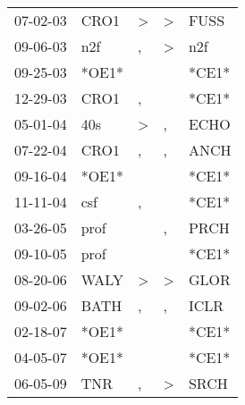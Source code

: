 \begin{supertabular}{p{0.07\textwidth}p{0.06\textwidth}p{0.02\textwidth}p{0.02\textwidth}p{0.06\textwidth}}
          07-02-03\textsuperscript{} &           CRO1\textsuperscript{} &     \textgreater &  \textgreater &           FUSS\textsuperscript{} \\
          09-06-03\textsuperscript{} &            n2f\textsuperscript{} &                , &  \textgreater &            n2f\textsuperscript{} \\
          09-25-03\textsuperscript{} &                            *OE1* &                  &               &                            *CE1* \\
          12-29-03\textsuperscript{} &           CRO1\textsuperscript{} &                , &               &                            *CE1* \\
          05-01-04\textsuperscript{} &            40s\textsuperscript{} &     \textgreater &             , &           ECHO\textsuperscript{} \\
          07-22-04\textsuperscript{} &           CRO1\textsuperscript{} &                , &             , &           ANCH\textsuperscript{} \\
          09-16-04\textsuperscript{} &                            *OE1* &                  &               &                            *CE1* \\
          11-11-04\textsuperscript{} &            csf\textsuperscript{} &                , &               &                            *CE1* \\
          03-26-05\textsuperscript{} &           prof\textsuperscript{} &                  &             , &           PRCH\textsuperscript{} \\
          09-10-05\textsuperscript{} &           prof\textsuperscript{} &                  &               &                            *CE1* \\
          08-20-06\textsuperscript{} &           WALY\textsuperscript{} &     \textgreater &  \textgreater &           GLOR\textsuperscript{} \\
          09-02-06\textsuperscript{} &           BATH\textsuperscript{} &                , &             , &           ICLR\textsuperscript{} \\
          02-18-07\textsuperscript{} &                            *OE1* &                  &               &                            *CE1* \\
          04-05-07\textsuperscript{} &                            *OE1* &                  &               &                            *CE1* \\
          06-05-09\textsuperscript{} &            TNR\textsuperscript{} &                , &  \textgreater &           SRCH\textsuperscript{} \\

\end{supertabular}

